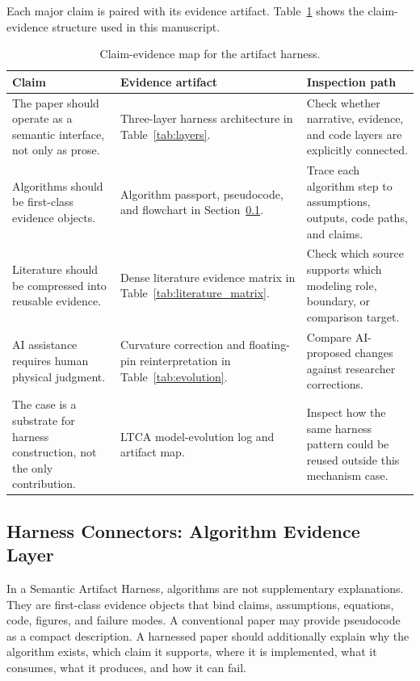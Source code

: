 \documentclass{article}
\begin{document}
Each major claim is paired with its evidence artifact. Table~\ref{tab:claim_map} shows the claim-evidence structure used in this manuscript.

\begin{table}[t]
\caption{Claim-evidence map for the artifact harness.}
\centering
\small
\begin{tabular}{p{3.3cm}p{5.0cm}p{5.0cm}}
\toprule
\textbf{Claim} & \textbf{Evidence artifact} & \textbf{Inspection path} \\
\midrule
The paper should operate as a semantic interface, not only as prose. & Three-layer harness architecture in Table~\ref{tab:layers}. & Check whether narrative, evidence, and code layers are explicitly connected. \\
Algorithms should be first-class evidence objects. & Algorithm passport, pseudocode, and flowchart in Section~\ref{sec:algorithm_layer}. & Trace each algorithm step to assumptions, outputs, code paths, and claims. \\
Literature should be compressed into reusable evidence. & Dense literature evidence matrix in Table~\ref{tab:literature_matrix}. & Check which source supports which modeling role, boundary, or comparison target. \\
AI assistance requires human physical judgment. & Curvature correction and floating-pin reinterpretation in Table~\ref{tab:evolution}. & Compare AI-proposed changes against researcher corrections. \\
The case is a substrate for harness construction, not the only contribution. & LTCA model-evolution log and artifact map. & Inspect how the same harness pattern could be reused outside this mechanism case. \\
\bottomrule
\end{tabular}
\label{tab:claim_map}
\end{table}

\subsection{Harness Connectors: Algorithm Evidence Layer}
\label{sec:algorithm_layer}

In a Semantic Artifact Harness, algorithms are not supplementary explanations. They are first-class evidence objects that bind claims, assumptions, equations, code, figures, and failure modes. A conventional paper may provide pseudocode as a compact description. A harnessed paper should additionally explain why the algorithm exists, which claim it supports, where it is implemented, what it consumes, what it produces, and how it can fail.
\end{document}
